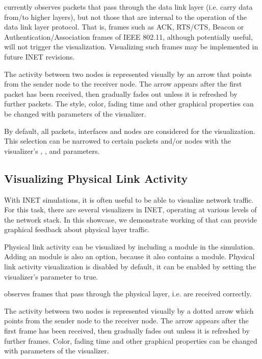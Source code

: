  currently observes packets that pass through the data link
layer (i.e. carry data from/to higher layers), but not those that are internal
to the operation of the data link layer protocol. That is, frames such as ACK,
RTS/CTS, Beacon or Authentication/Association frames of IEEE 802.11, although
potentially useful, will not trigger the visualization. Visualizing such frames
may be implemented in future INET revisions.

The activity between two nodes is represented visually by an arrow that points
from the sender node to the receiver node. The arrow appears after the first
packet has been received, then gradually fades out unless it is refreshed by
further packets. The style, color, fading time and other graphical properties
can be changed with parameters of the visualizer.

By default, all packets, interfaces and nodes are considered for the
visualization. This selection can be narrowed to certain packets and/or nodes
with the visualizer's , , and
 parameters.


\subsection{Visualizing Physical Link Activity}

With INET simulations, it is often useful to be able to visualize network
traffic. For this task, there are several visualizers in INET, operating at
various levels of the network stack. In this showcase, we demonstrate working of
 that can provide graphical feedback about physical layer
traffic.

Physical link activity can be visualized by including a 
module in the simulation. Adding an  module is also an
option, because it also contains a  module. Physical link
activity visualization is disabled by default, it can be enabled by setting the
visualizer's  parameter to true.

 observes frames that pass through the physical layer,
i.e. are received correctly.

The activity between two nodes is represented visually by a dotted arrow which
points from the sender node to the receiver node. The arrow appears after the
first frame has been received, then gradually fades out unless it is refreshed
by further frames. Color, fading time and other graphical properties can be
changed with parameters of the visualizer.

